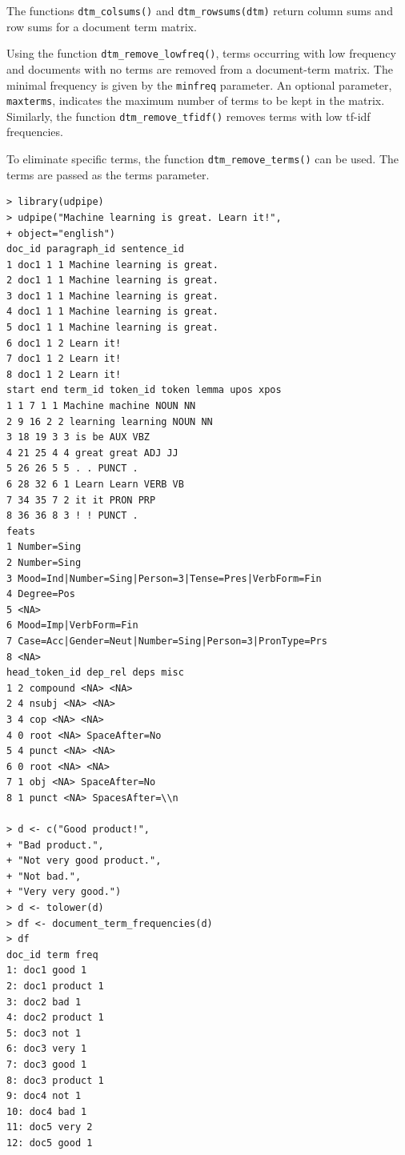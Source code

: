 The functions \texttt{dtm\_colsums()} and \texttt{dtm\_rowsums(dtm)} return column sums
and row sums for a document term matrix.

Using the function \texttt{dtm\_remove\_lowfreq()}, terms occurring with low frequency and documents with no terms are removed from a document-term matrix. The minimal frequency is given by the \texttt{minfreq} parameter. An optional
parameter, \texttt{maxterms}, indicates the maximum number of terms to be kept in the
matrix. Similarly, the function \texttt{dtm\_remove\_tfidf()} removes terms with low
tf-idf frequencies.

To eliminate specific terms, the function \texttt{dtm\_remove\_terms()} can be used.
The terms are passed as the terms parameter.

\begin{verbatim}
> library(udpipe)
> udpipe("Machine learning is great. Learn it!",
+ object="english")
doc_id paragraph_id sentence_id
1 doc1 1 1 Machine learning is great.
2 doc1 1 1 Machine learning is great.
3 doc1 1 1 Machine learning is great.
4 doc1 1 1 Machine learning is great.
5 doc1 1 1 Machine learning is great.
6 doc1 1 2 Learn it!
7 doc1 1 2 Learn it!
8 doc1 1 2 Learn it!
start end term_id token_id token lemma upos xpos
1 1 7 1 1 Machine machine NOUN NN
2 9 16 2 2 learning learning NOUN NN
3 18 19 3 3 is be AUX VBZ
4 21 25 4 4 great great ADJ JJ
5 26 26 5 5 . . PUNCT .
6 28 32 6 1 Learn Learn VERB VB
7 34 35 7 2 it it PRON PRP
8 36 36 8 3 ! ! PUNCT .
feats
1 Number=Sing
2 Number=Sing
3 Mood=Ind|Number=Sing|Person=3|Tense=Pres|VerbForm=Fin
4 Degree=Pos
5 <NA>
6 Mood=Imp|VerbForm=Fin
7 Case=Acc|Gender=Neut|Number=Sing|Person=3|PronType=Prs
8 <NA>
head_token_id dep_rel deps misc
1 2 compound <NA> <NA>
2 4 nsubj <NA> <NA>
3 4 cop <NA> <NA>
4 0 root <NA> SpaceAfter=No
5 4 punct <NA> <NA>
6 0 root <NA> <NA>
7 1 obj <NA> SpaceAfter=No
8 1 punct <NA> SpacesAfter=\\n

> d <- c("Good product!",
+ "Bad product.",
+ "Not very good product.",
+ "Not bad.",
+ "Very very good.")
> d <- tolower(d)
> df <- document_term_frequencies(d)
> df
doc_id term freq
1: doc1 good 1
2: doc1 product 1
3: doc2 bad 1
4: doc2 product 1
5: doc3 not 1
6: doc3 very 1
7: doc3 good 1
8: doc3 product 1
9: doc4 not 1
10: doc4 bad 1
11: doc5 very 2
12: doc5 good 1


\end{verbatim}

